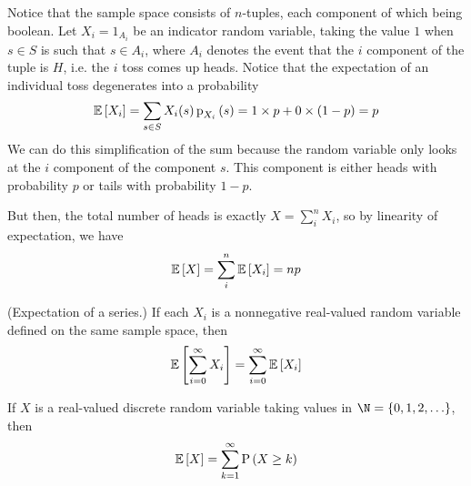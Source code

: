 \documentclass[11pt]{article}
\begin{document}
\begin{solution}
    Notice that the sample space consists of $n$-tuples, each component of
    which being boolean.
    Let $X_i = 1_{A_i}$ be an indicator random variable, taking the value $1$
    when $s \in S$ is such that $s \in A_i$, where $A_i$ denotes the event that
    the $i$\th{} component of the tuple is $H$, i.e. the $i$\th{} toss comes up
    heads.
    Notice that the expectation of an individual toss degenerates into a
    probability
    \begin{equation*}
        \E{X_i}
        = \sum_{s \in S} {
            X_i(s) \p[X_i]{s}
        }
        = 1 \times p + 0 \times (1-p)
        = p
    \end{equation*}
    We can do this simplification of the sum because the random variable only
    looks at the $i$\th{} component of the component $s$. This component is
    either heads with probability $p$ or tails with probability $1 - p$.

    But then, the total number of heads is exactly $X = \sum_i^n X_i$, so by
    linearity of expectation, we have
    \begin{equation*}
        \operatorname{\mathbb{E}}{\left[X\right]} = \sum_i^n { \operatorname{\mathbb{E}}{\left[X_i\right]} } = np
    \end{equation*}
\end{solution}

\begin{thm}{(Expectation of a series.)}
    \label{thm:expectation-series}
    If each $X_i$ is a nonnegative real-valued random variable defined on the
    same sample space, then
    \begin{equation}
        \label{eq:expectation-series}
        \operatorname{\mathbb{E}}{\left[\sum_{i=0}^\infty {X_i}\right]} = \sum_{i=0}^\infty {\operatorname{\mathbb{E}}{\left[X_i\right]}}
    \end{equation}
\end{thm}

\begin{eg}
    If $X$ is a real-valued discrete random variable taking values in
    $\N = \setof{0, 1, 2, \ldots}$, then
    \begin{equation*}
        \operatorname{\mathbb{E}}{\left[X\right]} = \sum_{k=1}^\infty \operatorname{P}{\left(X \geq k\right)}
    \end{equation*}
\end{eg}
\end{document}
